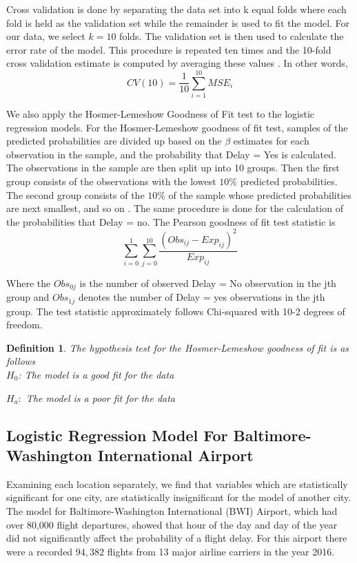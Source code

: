 \documentclass{asaproc}
\newtheorem{defn}{Definition}
\begin{document}
Cross validation is done by separating the data set into k equal folds where each fold is held as the validation set while the remainder is used to fit the model. For our data, we select $k=10$ folds. The validation set is then used to calculate the error rate of the model. This procedure is repeated ten times and the 10-fold cross validation estimate is computed by averaging these values \citep{james2013introduction}. In other words,
$$CV(10) = \frac{1}{10} \sum_{i=1}^{10} MSE_i$$

We also apply the Hosmer-Lemeshow Goodness of Fit test to the logistic regression models. For the Hosmer-Lemeshow goodness of fit test, samples of the predicted probabilities are divided up based on the $\beta$ estimates for each observation in the sample, and the probability that Delay = Yes is calculated. The observations in the sample are then split up into 10 groups. Then the first group consists of the observations with the lowest $10\%$ predicted probabilities. The second group consists of the $10\%$ of the sample whose predicted probabilities are next smallest, and so on \citep{hosmer1954applied}. The same procedure is done for the calculation of the probabilities that Delay = no. The Pearson goodness of fit test statistic is
$$\sum_{i=0}^1 \sum_{j=0}^{10} \frac{(Obs_{ij} - Exp_{ij})^2}{Exp_{ij}}$$

Where the $Obs_{0j}$ is the number of observed Delay = No observation in the jth group and $Obs_{1j}$ denotes the number of Delay = yes observations in the jth group. The test statistic approximately follows Chi-squared with 10-2 degrees of freedom. 
\begin{defn}\label{hostest}
The hypothesis test for the Hosmer-Lemeshow goodness of fit is as follows\\

$H_0$: The model is a good fit for the data

$H_a:$ The model is a poor fit for the data

\end{defn}

\subsection{Logistic Regression Model For Baltimore-Washington International Airport}

Examining each location separately, we find that variables which are statistically significant for one city, are statistically insignificant for the model of another city. The model for Baltimore-Washington International (BWI) Airport, which had over 80,000 flight departures, showed that hour of the day and day of the year did not significantly affect the probability of a flight delay. For this airport there were a recorded $94,382$ flights from 13 major airline carriers in the year 2016. 
\end{document}
